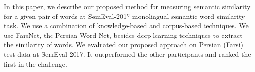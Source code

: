 In this paper, we describe our proposed method for measuring semantic similarity for a given pair of words at SemEval-2017 monolingual semantic word similarity task. We use a combination of knowledge-based and corpus-based techniques. We use FarsNet, the Persian Word Net, besides deep learning techniques to extract the similarity of words. We evaluated our proposed approach on Persian (Farsi) test data at SemEval-2017. It outperformed the other participants and ranked the first in the challenge.
